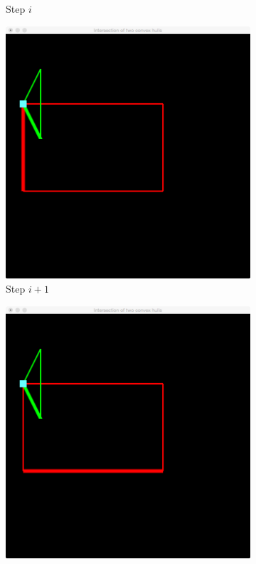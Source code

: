\begin{figure}
\begin{subfigure}{0.24\textwidth}
				\caption{Step $i$}
				\label{subfig:b:vertexOnVertex:step1}			
			\end{subfigure}
			\begin{subfigure}{0.24\textwidth}
				\includegraphics[width=\textwidth]{./img/b_step_2_deg_two}
				\caption{Step $i + 1$}
				\label{subfig:b:vertexOnVertex:step2}			
			\end{subfigure}		
			\begin{subfigure}{0.24\textwidth}
				\includegraphics[width=\textwidth]{./img/b_step_3_deg_two}

\end{subfigure}
\end{figure}
